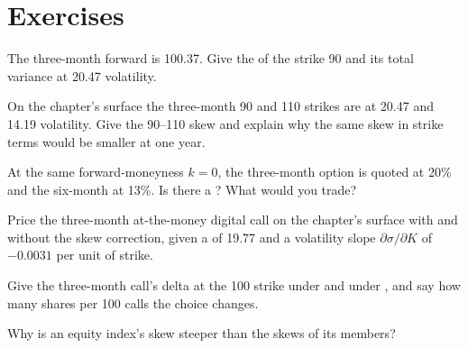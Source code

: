 \section{Exercises}

\begin{exercise}[$\star$]\label{exo:dv:implied-volatility-and-its-surface:1}
The three-month forward is 100.37. Give the  of the strike 90 and its total
variance at 20.47 volatility.
\end{exercise}

\begin{exercise}[$\star$]\label{exo:dv:implied-volatility-and-its-surface:2}
On the chapter's surface the three-month 90 and 110 strikes are at 20.47 and 14.19
volatility. Give the 90--110 skew and explain why the same skew in strike terms would be
smaller at one year.
\end{exercise}

\begin{exercise}[$\star$]\label{exo:dv:implied-volatility-and-its-surface:3}
At the same forward-moneyness $k=0$, the three-month option is quoted at 20\% and the
six-month at 13\%. Is there a ? What would you trade?
\end{exercise}

\begin{exercise}[$\star\star$]\label{exo:dv:implied-volatility-and-its-surface:4}
Price the three-month at-the-money digital call on the chapter's surface with and without
the skew correction, given a  of 19.77 and a volatility slope $\partial\sigma/\partial K$
of $-0.0031$ per unit of strike.
\end{exercise}

\begin{exercise}[$\star\star$]\label{exo:dv:implied-volatility-and-its-surface:5}
Give the three-month call's delta at the 100 strike under  and under , and say how many shares per 100 calls the choice changes.
\end{exercise}

\begin{exercise}[$\star\star$]\label{exo:dv:implied-volatility-and-its-surface:6}
Why is an equity index's skew steeper than the skews of its members?
\end{exercise}

